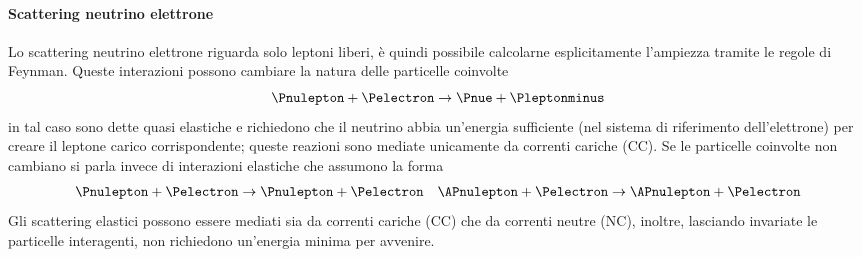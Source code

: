 \documentclass[../../main.tex]{subfiles}
\begin{document}
  \paragraph{Scattering neutrino elettrone}
    Lo scattering neutrino elettrone riguarda solo leptoni liberi, è quindi
    possibile calcolarne esplicitamente l'ampiezza tramite le regole di Feynman.
    Queste interazioni possono cambiare la natura delle particelle coinvolte
    \begin{equation*}
      \Pnulepton + \Pelectron \rightarrow \Pnue + \Pleptonminus
    \end{equation*}
    in tal caso sono dette quasi elastiche e richiedono che il neutrino abbia
    un'energia sufficiente (nel sistema di riferimento dell'elettrone) per
    creare il leptone carico corrispondente; queste reazioni sono mediate
    unicamente da correnti cariche (CC).
    Se le particelle coinvolte non cambiano si parla invece di interazioni
    elastiche che assumono la forma
    \begin{align*}
      \Pnulepton + \Pelectron \rightarrow \Pnulepton + \Pelectron &&
      \APnulepton + \Pelectron \rightarrow \APnulepton + \Pelectron
    \end{align*}
    Gli scattering elastici possono essere mediati sia da correnti cariche (CC)
    che da correnti neutre (NC), inoltre, lasciando invariate le particelle
    interagenti, non richiedono un'energia minima per avvenire.
\end{document}
